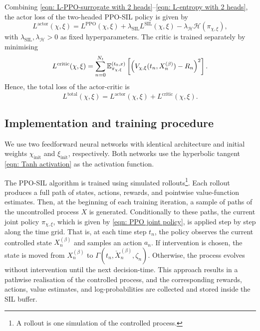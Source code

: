 Combining \eqref{eqn: L-PPO-surrogate with 2 heads}--\eqref{eqn: L-entropy with 2 heads}, the actor loss of the two-headed PPO-SIL policy is given by
\begin{equation*}
    L^{\text{actor}}(\chi, \xi) = L^{\text{PPO}}(\chi, \xi) + \lambda_{\text{SIL}}L^{\text{SIL}}(\chi, \xi) - \lambda_\mathcal{H}\mathcal{H}(\pi_{\chi, \xi}),
\end{equation*}
with $\lambda_{\text{SIL}}, \lambda_\mathcal{H}>0$ as fixed hyperparameters. The critic is trained separately by minimising 
\begin{equation*}
    L^{\text{critic}}(\chi, \xi) = \sum_{n=0}^{N_t} \mathbb{E}^{(t_0,x)}_{\pi_{\chi, \xi}}\left[ \left(V_{\chi, \xi}(t_n,X^{(\beta)}_n) - R_n\right)^2 \right].
\end{equation*}
Hence, the total loss of the actor-critic is 
\begin{equation}
    L^{\text{total}}(\chi, \xi) = L^{\text{actor}}(\chi, \xi) + L^{\text{critic}}(\chi, \xi).
    \label{eqn: L-total with 2 heads}
\end{equation}

\subsection{Implementation and training procedure}
We use two feedforward neural networks with identical architecture and initial weights $\chi_\text{init}$ and $\xi_\text{init}$, respectively. Both networks use the hyperbolic tangent \eqref{eqn: Tanh activation} as the activation function.

The PPO-SIL algorithm is trained using simulated rollouts\footnote{A rollout is one simulation of the controlled process.}. Each rollout produces a full path of states, actions, rewards, and pointwise value-function estimates. Then, at the beginning of each training iteration, a sample of paths of the uncontrolled process $X$ is generated. Conditionally to these paths, the current joint policy $\pi_{\chi, \xi}$, which is given by \eqref{eqn: PPO joint policy}, is applied step by step along the time grid. That is, at each time step $t_n$, the policy observes the current controlled state $X_n^{(\beta)}$ and samples an action $a_n$. If intervention is chosen, the state is moved from $X_n^{(\beta)}$ to $\Gamma(t_n,\check{X}_n^{(\beta)},\zeta_n)$. Otherwise, the process evolves without intervention until the next decision-time. This approach results in a pathwise realisation of the controlled process, and the corresponding rewards, actions, value estimates, and log-probabilities are collected and stored inside the SIL buffer.

